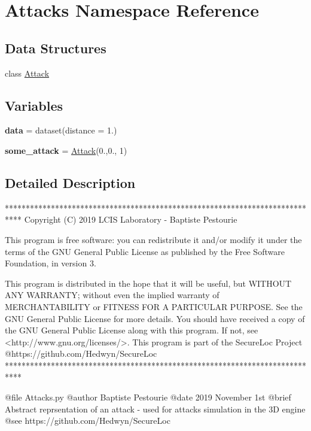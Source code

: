 \hypertarget{namespace_attacks}{}\section{Attacks Namespace Reference}
\label{namespace_attacks}
\subsection*{Data Structures}
\begin{DoxyCompactItemize}
\item 
class \mbox{\hyperlink{class_attacks_1_1_attack}{Attack}}
\end{DoxyCompactItemize}
\subsection*{Variables}
\begin{DoxyCompactItemize}
\item 
\mbox{\label{namespace_attacks_a511ae0b1c13f95e5f08f1a0dd3da3d93}} 
{\bfseries data} = dataset(distance = 1.)
\item 
\mbox{\label{namespace_attacks_a0db4d69884136364f85670711a495185}} 
{\bfseries some\+\_\+attack} = \mbox{\hyperlink{class_attacks_1_1_attack}{Attack}}(0.,0., 1)
\end{DoxyCompactItemize}


\subsection{Detailed Description}
\begin{DoxyVerb}****************************************************************************
Copyright (C) 2019 LCIS Laboratory - Baptiste Pestourie

This program is free software: you can redistribute it and/or modify
it under the terms of the GNU General Public License as published by
the Free Software Foundation, in version 3.

This program is distributed in the hope that it will be useful,
but WITHOUT ANY WARRANTY; without even the implied warranty of
MERCHANTABILITY or FITNESS FOR A PARTICULAR PURPOSE. See the
GNU General Public License for more details.
You should have received a copy of the GNU General Public License
along with this program. If not, see <http://www.gnu.org/licenses/>.
This program is part of the SecureLoc Project @https://github.com/Hedwyn/SecureLoc
 ****************************************************************************

@file Attacks.py
@author Baptiste Pestourie
@date 2019 November 1st
@brief Abstract reprsentation of an attack - used for attacks simulation in the 3D engine
@see https://github.com/Hedwyn/SecureLoc
\end{DoxyVerb}
 